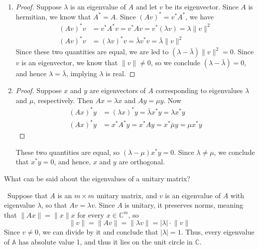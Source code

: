 \documentclass[12pt]{article}
\newenvironment{ex}[2][Exercise]{\begin{trivlist}
		\item[\hskip \labelsep {\bfseries #1}\hskip \labelsep {\bfseries #2.}]}{\end{trivlist}}
\newenvironment{sol}[1][Solution]{\begin{trivlist}
		\item[\hskip \labelsep {\bfseries #1:}]}{\end{trivlist}}
\begin{document}
\begin{sol}
	\
	\begin{enumerate}[label=(\alph*)]
		\item \begin{proof}
			Suppose $\lambda$ is an eigenvalue of $A$ and let $v$ be its eigenvector.
			Since $A$ is hermitian, we know that $A^*=A$. Since $(Av)^*=v^*A^*$, we have
			\begin{align*}
				(Av)^*v &= v^*A^*v = v^* Av = v^*(\lambda v) = \lambda \lVert v\rVert^2\\
				(Av)^*v &= (\lambda v)^*v = \bar{\lambda}v^* v = \bar{\lambda}\lVert v\rVert^2
			\end{align*}
			Since these two quantities are equal, we are led to $(\lambda - \bar{\lambda})\lVert v\rVert^2 = 0$.
			Since $v$ is an eigenvector, we know that $\lVert v\rVert \neq 0$, so we conclude
			$(\lambda - \bar{\lambda})=0$, and hence $\lambda=\bar{\lambda}$, implying $\lambda$ is real.
		\end{proof}
		\item \begin{proof}
			Suppose $x$ and $y$ are eigenvectors of $A$ corresponding to eigenvalues $\lambda$ and
			$\mu$, respectively. Then $Ax=\lambda x$ and $Ay=\mu y$. Now
			\begin{align*}
				(Ax)^*y &= (\lambda x)^* y = \bar{\lambda }x^*y = \lambda x^* y\\
				(Ax)^*y &= x^* A^*y = x^* Ay = x^* \bar{\mu} y = \mu x^*y
			\end{align*}
		\end{proof}
		These two quantities are equal, so $(\lambda - \mu)x^*y=0$. Since $\lambda \neq \mu$, we
		conclude that $x^*y=0$, and hence, $x$ and $y$ are orthogonal.
	\end{enumerate}
\end{sol}

\begin{ex}{4}
	What can be said about the eigenvalues of a unitary matrix?
\end{ex}

\begin{sol}
	\
	Suppose that $A$ is an $m\times m$ unitary matrix, and $v$ is an eigenvalue of $A$
	with eigenvalue $\lambda$, so that $Av=\lambda v$. Since $A$ is unitary, it preserves
	norms, meaning that $\lVert Ax\rVert = \lVert x\rVert x$ for every $x\in \mathbb{C}^{m}$, so
	\[
	\lVert v\rVert = \lVert Av\rVert = \lVert \lambda v\rVert = |\lambda|\cdot \lVert v\rVert
	\]
	Since $v\neq 0$, we can divide by it and conclude that $|\lambda|=1$. Thus, every eigenvalue
	of $\mathbb{A}$ has absolute value 1, and thus it lies on the unit circle in $\mathbb{C}$.
\end{sol}
\end{document}
